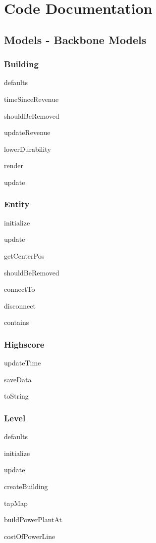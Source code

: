 \chapter{Code Documentation}
\clearpage 

\section{Models - Backbone Models}

\subsection*{Building}
	defaults

	timeSinceRevenue

	shouldBeRemoved

	updateRevenue

	lowerDurability

	render

	update

\subsection*{Entity}

	initialize

	update

	getCenterPos

	shouldBeRemoved

	connectTo

	disconnect

	contains

\subsection*{Highscore}

	updateTime

	saveData

	toString

\subsection*{Level}
	
	defaults

	initialize

	update

	createBuilding

	tapMap

	buildPowerPlantAt

	costOfPowerLine

